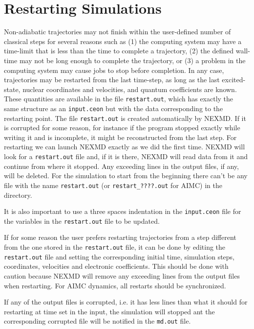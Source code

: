 \section{Restarting Simulations}
\label{restart}
Non-adiabatic trajectories may not finish within the user-defined number of classical steps for several reasons such as (1) the computing system may have a time-limit that is less than the time to complete a trajectory, (2) the defined wall-time may not be long enough to complete the trajectory, or (3) a problem in the computing system may cause jobs to stop before completion.  In any case, trajectories may be restarted from the last time-step, as long as the last excited-state, nuclear coordinates and velocities, and quantum coefficients are known.  These quantities are available in the file \verb+restart.out+, which has exactly the same structure as an \verb+input.ceon+ but with the data corresponding to the restarting point. The file \verb+restart.out+ is created automatically by NEXMD. If it is corrupted for some reason, for instance if the program stopped exactly while writing it and is incomplete, it might be reconstructed from the last step. For restarting we can launch NEXMD exactly as we did the first time. NEXMD will look for a \verb+restart.out+ file and, if it is there, NEXMD will read data from it and continue from where it stopped. Any exceeding lines in the output files, if any, will be deleted. For the simulation to start from the beginning there can't be any file with the name \verb+restart.out+ (or \verb+restart_????.out+ for AIMC) in the directory.

It is also important to use a three spaces indentation in the \verb+input.ceon+ file for the variables in the \verb+restart.out+ file to be updated.

If for some reason the user prefers restarting trajectories from a step different from the one stored in the \verb+restart.out+ file, it can be done by editing the \verb+restart.out+ file and setting the corresponding initial time, simulation steps, coordinates, velocities and electronic coefficients. This should be done with caution because NEXMD will remove any exceeding lines from the output files when restarting. For AIMC dynamics, all restarts should be synchronized.

If any of the output files is corrupted, i.e. it has less lines than what it should for restarting at time set in the input, the simulation will stopped ant the corresponding corrupted file will be notified in the \verb+md.out+ file.